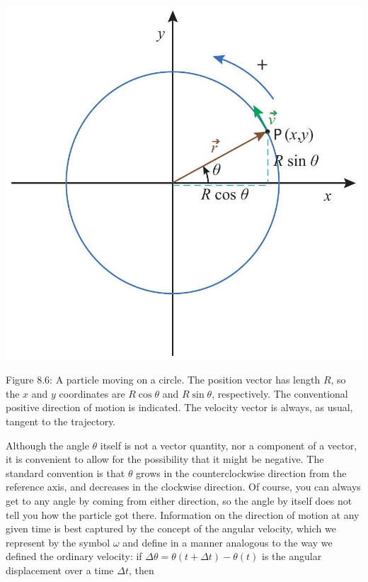 \documentclass[10pt]{article}
\begin{document}
\begin{center}
\includegraphics[max width=\textwidth]{2024_09_14_9969b06773f10b6936e8g-191}
\end{center}

Figure 8.6: A particle moving on a circle. The position vector has length $R$, so the $x$ and $y$ coordinates are $R \cos \theta$ and $R \sin \theta$, respectively. The conventional positive direction of motion is indicated. The velocity vector is always, as usual, tangent to the trajectory.

Although the angle $\theta$ itself is not a vector quantity, nor a component of a vector, it is convenient to allow for the possibility that it might be negative. The standard convention is that $\theta$ grows in the counterclockwise direction from the reference axis, and decreases in the clockwise direction. Of course, you can always get to any angle by coming from either direction, so the angle by itself does not tell you how the particle got there. Information on the direction of motion at any given time is best captured by the concept of the angular velocity, which we represent by the symbol $\omega$ and define in a manner analogous to the way we defined the ordinary velocity: if $\Delta \theta=\theta(t+\Delta t)-\theta(t)$ is the angular displacement over a time $\Delta t$, then
\end{document}
